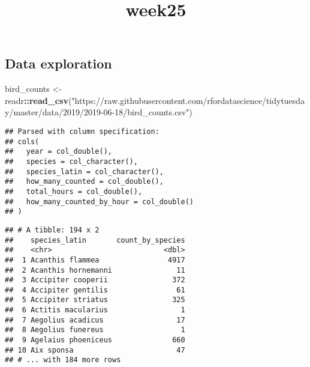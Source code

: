 \documentclass[]{article}
\title{week25}
\author{}
\date{}
\newenvironment{Shaded}{\begin{snugshade}}{\end{snugshade}}
\newcommand{\KeywordTok}[1]{\textcolor[rgb]{0.13,0.29,0.53}{\textbf{#1}}}
\newcommand{\DataTypeTok}[1]{\textcolor[rgb]{0.13,0.29,0.53}{#1}}
\newcommand{\DecValTok}[1]{\textcolor[rgb]{0.00,0.00,0.81}{#1}}
\newcommand{\StringTok}[1]{\textcolor[rgb]{0.31,0.60,0.02}{#1}}
\newcommand{\CommentTok}[1]{\textcolor[rgb]{0.56,0.35,0.01}{\textit{#1}}}
\newcommand{\OperatorTok}[1]{\textcolor[rgb]{0.81,0.36,0.00}{\textbf{#1}}}
\newcommand{\NormalTok}[1]{#1}
\begin{document}
\maketitle

\subsection{Data exploration}\label{data-exploration}

\begin{Shaded}
\begin{Highlighting}[]
\NormalTok{bird_counts <-}\StringTok{ }\NormalTok{readr}\OperatorTok{::}\KeywordTok{read_csv}\NormalTok{(}\StringTok{"https://raw.githubusercontent.com/rfordatascience/tidytuesday/master/data/2019/2019-06-18/bird_counts.csv"}\NormalTok{)}
\end{Highlighting}
\end{Shaded}

\begin{verbatim}
## Parsed with column specification:
## cols(
##   year = col_double(),
##   species = col_character(),
##   species_latin = col_character(),
##   how_many_counted = col_double(),
##   total_hours = col_double(),
##   how_many_counted_by_hour = col_double()
## )
\end{verbatim}

\begin{Shaded}
\end{Shaded}

\begin{verbatim}
## # A tibble: 194 x 2
##    species_latin       count_by_species
##    <chr>                          <dbl>
##  1 Acanthis flammea                4917
##  2 Acanthis hornemanni               11
##  3 Accipiter cooperii               372
##  4 Accipiter gentilis                61
##  5 Accipiter striatus               325
##  6 Actitis macularius                 1
##  7 Aegolius acadicus                 17
##  8 Aegolius funereus                  1
##  9 Agelaius phoeniceus              660
## 10 Aix sponsa                        47
## # ... with 184 more rows
\end{verbatim}
\end{document}
